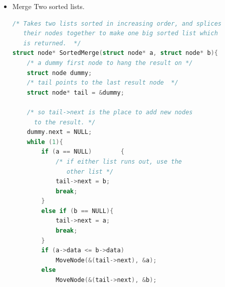 \documentclass[a4paper,11pt,twoside]{book}
\begin{document}
\begin{itemize}
\begin{lstlisting}[frame=single, language=c++]
  /* Pick either a or b, and recur */
  if (a->data <= b->data){
     result = a;
     result->next = SortedMerge(a->next, b);
  }
  else{
     result = b;
     result->next = SortedMerge(a, b->next);
  }
  return(result);
}
 \end{lstlisting}
\begin{description}
	\item[Source code:] \textbf{Idea: recursive}
\end{description}
 
 \begin{lstlisting}[frame=single, language=c++] 
/* UTILITY FUNCTIONS */
/* Split the nodes of the given list into front and back halves,
     and return the two lists using the reference parameters.
     If the length is odd, the extra node should go in the front list.
     Uses the fast/slow pointer strategy.  */
void FrontBackSplit(struct node* source,
          struct node** frontRef, struct node** backRef)
{
  struct node* fast;
  struct node* slow;
  if (source==NULL || source->next==NULL)
  {
    /* length < 2 cases */
    *frontRef = source;
    *backRef = NULL;
  }
  else
  {
    slow = source;
    fast = source->next;
 
    /* Advance 'fast' two nodes, and advance 'slow' one node */
    while (fast != NULL)
    {
      fast = fast->next;
      if (fast != NULL)
      {
        slow = slow->next;
        fast = fast->next;
      }
    }
 
    /* 'slow' is before the midpoint in the list, so split it in two
      at that point. */
    *frontRef = source;
    *backRef = slow->next;
    slow->next = NULL;
  }
}

\end{lstlisting}

\item Merge Two sorted lists.
\begin{lstlisting}[frame=single, language=c++]
/* Takes two lists sorted in increasing order, and splices
   their nodes together to make one big sorted list which
   is returned.  */
struct node* SortedMerge(struct node* a, struct node* b){
    /* a dummy first node to hang the result on */
    struct node dummy;
    /* tail points to the last result node  */
    struct node* tail = &dummy;

    /* so tail->next is the place to add new nodes
      to the result. */
    dummy.next = NULL;
    while (1){
        if (a == NULL)        {
            /* if either list runs out, use the
               other list */
            tail->next = b;
            break;
        }
        else if (b == NULL){
            tail->next = a;
            break;
        }
        if (a->data <= b->data)
            MoveNode(&(tail->next), &a);
        else
            MoveNode(&(tail->next), &b);
 

\end{lstlisting}
\end{itemize}
\end{document}
